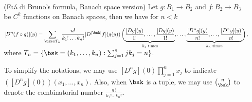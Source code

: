 \begin{theorem}\label{thm:faadiBrunoBanach}
(Fa\'{a} di Bruno's formula, Banach space version) Let $g:B_1\rightarrow B_2$ and $f: B_2\rightarrow B_3$ be $C^k$ functions on Banach spaces, then we have for $n < k$

$$[D^n(f\circ g)](y) = \sum_{\bsk\in T_n}\frac{n!}{k_1!\ldots k_n!}[D^{|\bsk|}f](g(y)) \left(\smash[b]{\underbrace{\frac{[Dg](y)}{1!},\ldots, \frac{[Dg](y)}{1!}}_\text{$k_1$ times}},\ldots,\smash[b]{\underbrace{\frac{[D^{n}g](y)}{n!},\ldots, \frac{[D^{n}g](y)}{n!}}_\text{$k_n$ times}}\right),$$ where $T_n = \{\bsk = (k_1,\ldots,k_n) : \sum_{j=1}^n jk_j = n\}$. 
\end{theorem}
\begin{remark}
To simplify the notations, we may use $[D^ng](0)\prod_{j=1}^nx_j$ to indicate $([D^ng](0))(x_1,...,x_n)$.
Also, when $\bsk$ is a tuple, we may use ${n \choose \bsk}$ to denote the combinatorial number $\frac{n!}{k_1!\ldots k_n!}$.
\end{remark} 
